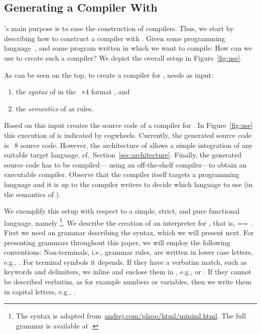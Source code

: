 \subsection{Generating  a Compiler With \Tosca} \label{sec:use}

\Tosca's main purpose is to ease the construction of
compilers. Thus, we start by describing how to construct a compiler
with \Tosca. Given some programming language~\PL, and some
program written in \PL which we want to compile: How can we use
\Tosca to create such a compiler? We depict the overall setup in
Figure~\ref{fig:use}.
%

%
As can be seen on the top, to create a compiler for \PL, \Tosca
needs as input:
\begin{enumerate}
\item the \emph{syntax} of \PL in the
  \antlr~v4 format \cite{Parr:2013:DAR:2501720}, and
\item the \emph{semantics} of \PL as \Tosca rules.
\end{enumerate}
%
Based on this input \Tosca creates the source code of a compiler
for \PL. In Figure~\ref{fig:use} this execution of \Tosca is
indicated by cogwheels.
%
Currently, the generated
source code is \java~8 source code. However, the architecture of
\Tosca allows a simple integration of any suitable target
language, cf.~Section~\ref{sec:architecture}.
%
Finally, the generated \java source code has to be compiled---%
using an off-the-shelf \java compiler---to obtain
an executable \PL compiler. Observe that the \PL compiler 
itself targets a programming language and it is up to the compiler writers to 
decide which language to use (in the semantics of \PL).

We exemplify this setup with respect to a simple, strict, and
pure functional language, namely \MiniML
%
\footnote{The syntax is adapted from~\href{http://andrej.com/plzoo/html/miniml.html}{\url{andrej.com/plzoo/html/miniml.html}}. 
The full \antlr grammar is available at 
.}.
%
We describe the creation of an interpreter for \MiniML, 
that is, \PL == \MiniML. First we need an \antlr grammar
describing the syntax, which we will present next. For presenting
\antlr grammars throughout this paper, we will employ the following
conventions: Non-terminals, i.e., \antlr grammar rules, are written in
lower case letters, e.g., . For terminal symbols it
depends. If they have a verbatim match, such as keywords and
delimiters, we inline and enclose them in , e.g.,
 or . If they cannot be described
verbatim, as for example numbers or variables, then we write them in
capital letters, e.g., . 

